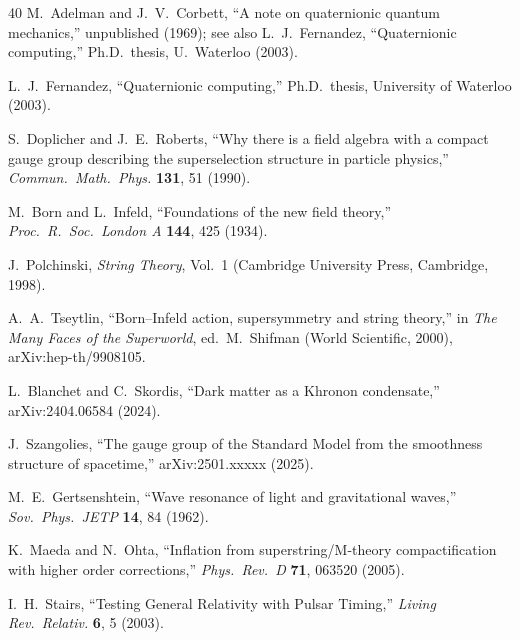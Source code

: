 \documentclass[prl,twocolumn,superscriptaddress,longbibliography]{revtex4-2}
\begin{document}
\begin{thebibliography}{40}
M.~Adelman and J.~V.~Corbett,
``A note on quaternionic quantum mechanics,''
unpublished (1969);
see also L.~J.~Fernandez,
``Quaternionic computing,''
Ph.D.\ thesis, U.\ Waterloo (2003).

L.~J.~Fernandez,
``Quaternionic computing,''
Ph.D.\ thesis, University of Waterloo (2003).


S.~Doplicher and J.~E.~Roberts,
``Why there is a field algebra with a compact gauge group
describing the superselection structure in particle physics,''
\textit{Commun.\ Math.\ Phys.} \textbf{131}, 51 (1990).


M.~Born and L.~Infeld,
``Foundations of the new field theory,''
\textit{Proc.\ R.\ Soc.\ London A} \textbf{144}, 425 (1934).

J.~Polchinski,
\textit{String Theory}, Vol.~1
(Cambridge University Press, Cambridge, 1998).

A.~A.~Tseytlin,
``Born--Infeld action, supersymmetry and string theory,''
in \textit{The Many Faces of the Superworld},
ed.\ M.~Shifman (World Scientific, 2000),
arXiv:hep-th/9908105.


L.~Blanchet and C.~Skordis,
``Dark matter as a Khronon condensate,''
arXiv:2404.06584 (2024).


J.~Szangolies,
``The gauge group of the Standard Model from the
smoothness structure of spacetime,''
arXiv:2501.xxxxx (2025).


M.~E.~Gertsenshtein,
``Wave resonance of light and gravitational waves,''
\textit{Sov.\ Phys.\ JETP} \textbf{14}, 84 (1962).


K.~Maeda and N.~Ohta,
``Inflation from superstring/M-theory compactification with
higher order corrections,''
\textit{Phys.\ Rev.\ D} \textbf{71}, 063520 (2005).


I.~H.~Stairs,
``Testing General Relativity with Pulsar Timing,''
\textit{Living Rev.\ Relativ.} \textbf{6}, 5 (2003).


\end{thebibliography}
\end{document}
